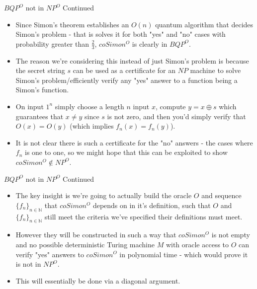 \documentclass[aspectratio=169]{beamer}
\begin{document}
\begin{frame}{$BQP^O$ not in $NP^O$ Continued}
  \begin{itemize}
  \item Since Simon's theorem establishes an $O(n)$ quantum algorithm that decides Simon's problem - that is solves it for both "yes" and "no" cases with probability greater than $\frac{2}{3}$, $coSimon^O$ is clearly in $BQP^O$. \pause
  \item The reason we're considering this instead of just Simon's problem is because the secret string $s$ can be used as a certificate for an $NP$ machine to solve Simon's problem/efficiently verify any "yes" answer to a function being a Simon's function. \pause
  \item On input $1^n$ simply choose a length $n$ input $x$, compute $y = x \oplus s$ which guarantees that $x \neq y$ since $s$ is not zero, and then you'd simply verify that $O(x) = O(y)$ (which implies $f_{n}(x) = f_{n}(y)$). \pause
  \item It is not clear there is such a certificate for the "no" answers - the cases where $f_n$ is one to one, so we might hope that this can be exploited to show $coSimon^O \notin NP^O$. 
  \end{itemize}
\end{frame}

\begin{frame}{$BQP^O$ not in $NP^O$ Continued}
  \begin{itemize}
  \item The key insight is we're going to actually build the oracle $O$ and sequence $\{f_n\}_{n \in \mathbb{N}}$ that $coSimon^O$ depends on in it's definition, such that $O$ and $\{f_n\}_{n \in \mathbb{N}}$ still meet the criteria we've specified their definitions must meet. \pause
  \item However they will be constructed in such a way that $coSimon^O$ is not empty and no possible deterministic Turing machine $M$ with oracle access to $O$ can verify "yes" answers to $coSimon^O$ in polynomial time - which would prove it is not in $NP^O$. \pause
  \item This will essentially be done via a diagonal argument.
  \end{itemize}
\end{frame}
\end{document}

